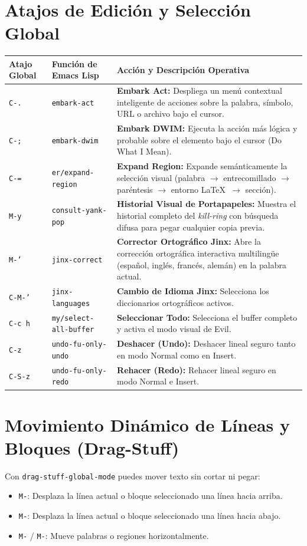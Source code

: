 \documentclass[11pt,book,spanish,alphabetic]{apuntes-scr}
\begin{document}
\section{Atajos de Edición y Selección Global}
\begin{center}
\small
\begin{tabularx}{\linewidth}{p{2.5cm} p{4.2cm} X}
\toprule
\textbf{Atajo Global} & \textbf{Función de Emacs Lisp} & \textbf{Acción y Descripción Operativa} \\
\midrule
\texttt{C-.} & \texttt{embark-act} & \textbf{Embark Act:} Despliega un menú contextual inteligente de acciones sobre la palabra, símbolo, URL o archivo bajo el cursor. \\
\texttt{C-;} & \texttt{embark-dwim} & \textbf{Embark DWIM:} Ejecuta la acción más lógica y probable sobre el elemento bajo el cursor (Do What I Mean). \\
\texttt{C-=} & \texttt{er/expand-region} & \textbf{Expand Region:} Expande semánticamente la selección visual (palabra $\to$ entrecomillado $\to$ paréntesis $\to$ entorno \LaTeX\ $\to$ sección). \\
\texttt{M-y} & \texttt{consult-yank-pop} & \textbf{Historial Visual de Portapapeles:} Muestra el historial completo del \textit{kill-ring} con búsqueda difusa para pegar cualquier copia previa. \\
\texttt{M-'} & \texttt{jinx-correct} & \textbf{Corrector Ortográfico Jinx:} Abre la corrección ortográfica interactiva multilingüe (español, inglés, francés, alemán) en la palabra actual. \\
\texttt{C-M-'} & \texttt{jinx-languages} & \textbf{Cambio de Idioma Jinx:} Selecciona los diccionarios ortográficos activos. \\
\texttt{C-c h} & \texttt{my/select-all-buffer} & \textbf{Seleccionar Todo:} Selecciona el buffer completo y activa el modo visual de Evil. \\
\texttt{C-z} & \texttt{undo-fu-only-undo} & \textbf{Deshacer (Undo):} Deshacer lineal seguro tanto en modo Normal como en Insert. \\
\texttt{C-S-z} & \texttt{undo-fu-only-redo} & \textbf{Rehacer (Redo):} Rehacer lineal seguro en modo Normal e Insert. \\
\bottomrule
\end{tabularx}
\end{center}

\section{Movimiento Dinámico de Líneas y Bloques (Drag-Stuff)}
Con \texttt{drag-stuff-global-mode} puedes mover texto sin cortar ni pegar:
\begin{itemize}[leftmargin=8mm]
    \item \texttt{M-\string\uparrow}: Desplaza la línea actual o bloque seleccionado una línea hacia arriba.
    \item \texttt{M-\string\downarrow}: Desplaza la línea actual o bloque seleccionado una línea hacia abajo.
    \item \texttt{M-\string\leftarrow} / \texttt{M-\string\rightarrow}: Mueve palabras o regiones horizontalmente.
\end{itemize}
\end{document}
